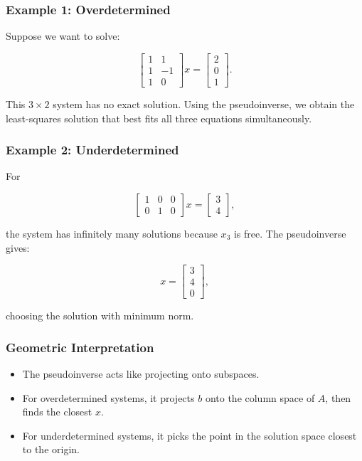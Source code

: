 \documentclass[
  letterpaper,
  DIV=11,
  numbers=noendperiod]{scrreprt}
\providecommand{\tightlist}{%
  \setlength{\itemsep}{0pt}\setlength{\parskip}{0pt}}
\begin{document}
\subsubsection{Example 1:
Overdetermined}\label{example-1-overdetermined}

Suppose we want to solve:

\[
\begin{bmatrix}1 & 1 \\ 1 & -1 \\ 1 & 0\end{bmatrix} x = \begin{bmatrix}2 \\ 0 \\ 1\end{bmatrix}.
\]

This \(3 \times 2\) system has no exact solution. Using the
pseudoinverse, we obtain the least-squares solution that best fits all
three equations simultaneously.

\subsubsection{Example 2:
Underdetermined}\label{example-2-underdetermined}

For

\[
\begin{bmatrix}1 & 0 & 0 \\ 0 & 1 & 0\end{bmatrix} x = \begin{bmatrix}3 \\ 4\end{bmatrix},
\]

the system has infinitely many solutions because \(x_3\) is free. The
pseudoinverse gives:

\[
x = \begin{bmatrix}3 \\ 4 \\ 0\end{bmatrix},
\]

choosing the solution with minimum norm.

\subsubsection{Geometric
Interpretation}\label{geometric-interpretation-16}

\begin{itemize}
\tightlist
\item
  The pseudoinverse acts like projecting onto subspaces.
\item
  For overdetermined systems, it projects \(b\) onto the column space of
  \(A\), then finds the closest \(x\).
\item
  For underdetermined systems, it picks the point in the solution space
  closest to the origin.
\end{itemize}
\end{document}
